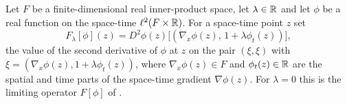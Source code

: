 \begin{definition}
Let $F$ be a finite-dimensional real inner-product space, let $\lambda\in\mathbb{R}$ and
let $\phi$ be a real function on the space-time $\ell^2(F\times\mathbb{R})$. For a
space-time point $z$ set
\[
  F_\lambda[\phi](z)
   =D^2\phi(z)\bigl[(\nabla_x\phi(z),\,1+\lambda\phi_t(z))\bigr],
\]
the value of the second derivative of $\phi$ at $z$ on the pair $(\xi,\xi)$ with
$\xi=(\nabla_x\phi(z),1+\lambda\phi_t(z))$, where $\nabla_x\phi(z)\in F$ and
$\phi_t(z)\in\mathbb{R}$ are the spatial and time parts of the space-time gradient
$\nabla\phi(z)$. For $\lambda=0$ this is the limiting operator $F[\phi]$ of
.
\end{definition}
